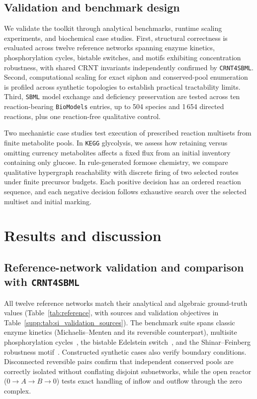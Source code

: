\documentclass[10pt,a4paper,fleqn]{article}
\begin{document}
\subsection{Validation and benchmark design}
\label{sec:validation_design}

We validate the toolkit through analytical benchmarks, runtime scaling experiments, and biochemical case studies. First, structural correctness is evaluated across twelve reference networks spanning enzyme kinetics, phosphorylation cycles, bistable switches, and motifs exhibiting concentration robustness, with shared CRNT invariants independently confirmed by \texttt{CRNT4SBML}. Second, computational scaling for exact siphon and conserved-pool enumeration is profiled across synthetic topologies to establish practical tractability limits. Third, \texttt{SBML} model exchange and deficiency preservation are tested across ten reaction-bearing \texttt{BioModels} entries, up to 504 species and 1\,654 directed reactions, plus one reaction-free qualitative control.

Two mechanistic case studies test execution of prescribed reaction multisets from finite metabolite pools. In \texttt{KEGG} glycolysis, we assess how retaining versus omitting currency metabolites affects a fixed flux from an initial inventory containing only glucose. In rule-generated formose chemistry, we compare qualitative hypergraph reachability with discrete firing of two selected routes under finite precursor budgets. Each positive decision has an ordered reaction sequence, and each negative decision follows exhaustive search over the selected multiset and initial marking.

\section{Results and discussion}
\label{sec:usecase}

\subsection{Reference-network validation and comparison with \texttt{CRNT4SBML}}
\label{sec:results_validation}

All twelve reference networks match their analytical and algebraic ground-truth values (Table~\ref{tab:reference}, with sources and validation objectives in Table~\ref{supp:tab:si_validation_sources}). The benchmark suite spans classic enzyme kinetics (Michaelis--Menten and its reversible counterpart), multisite phosphorylation cycles~\cite{wang2008multisite}, the bistable Edelstein switch~\cite{edelstein1970biochemical}, and the Shinar--Feinberg robustness motif~\cite{shinar2010structural}. Constructed synthetic cases also verify boundary conditions. Disconnected reversible pairs confirm that independent conserved pools are correctly isolated without conflating disjoint subnetworks, while the open reactor ($0 \to A \to B \to 0$) tests exact handling of inflow and outflow through the zero complex.
\end{document}
